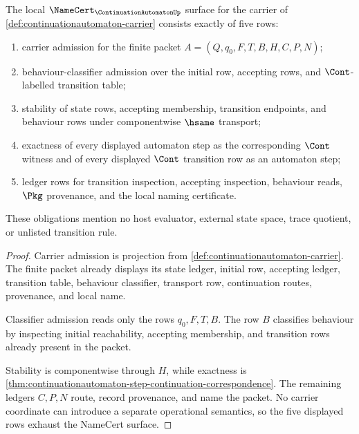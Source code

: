 \begin{theorem}\label{thm:continuationautomaton-namecert-obligations}
The local $\NameCert_{\ContinuationAutomatonUp}$ surface for the carrier of \autoref{def:continuationautomaton-carrier} consists exactly of five rows:
\begin{enumerate}
\item carrier admission for the finite packet $A=(Q,q_0,F,T,B,H,C,P,N)$;
\item behaviour-classifier admission over the initial row, accepting rows, and $\Cont$-labelled transition table;
\item stability of state rows, accepting membership, transition endpoints, and behaviour rows under componentwise $\hsame$ transport;
\item exactness of every displayed automaton step as the corresponding $\Cont$ witness and of every displayed $\Cont$ transition row as an automaton step;
\item ledger rows for transition inspection, accepting inspection, behaviour reads, $\Pkg$ provenance, and the local naming certificate.
\end{enumerate}
These obligations mention no host evaluator, external state space, trace quotient, or unlisted transition rule.
\end{theorem}
\begin{proof}
Carrier admission is projection from \autoref{def:continuationautomaton-carrier}. The finite packet already displays its state ledger, initial row, accepting ledger, transition table, behaviour classifier, transport row, continuation routes, provenance, and local name.

Classifier admission reads only the rows $q_0,F,T,B$. The row $B$ classifies behaviour by inspecting initial reachability, accepting membership, and transition rows already present in the packet.

Stability is componentwise through $H$, while exactness is \autoref{thm:continuationautomaton-step-continuation-correspondence}. The remaining ledgers $C,P,N$ route, record provenance, and name the packet. No carrier coordinate can introduce a separate operational semantics, so the five displayed rows exhaust the NameCert surface.
\end{proof}


